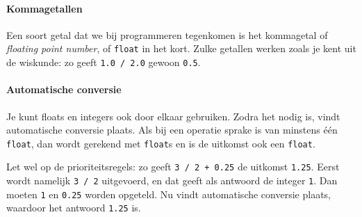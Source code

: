 \paragraph{Kommagetallen}

Een soort getal dat we bij programmeren tegenkomen is het kommagetal of \emph{floating point number}, of \texttt{float} in het kort. Zulke getallen werken zoals je kent uit de wiskunde: zo geeft \texttt{1.0\,/\,2.0} gewoon \texttt{0.5}.

\paragraph{Automatische conversie}

Je kunt floats en integers ook door elkaar gebruiken. Zodra het nodig is, vindt automatische conversie plaats. Als bij een operatie sprake is van minstens \'{e}\'{e}n \texttt{float}, dan wordt gerekend met \texttt{float}s en is de uitkomst ook een \texttt{float}.

Let wel op de prioriteitsregels: zo geeft \texttt{3\,/\,2\,+\,0.25} de uitkomst \texttt{1.25}. Eerst wordt namelijk \texttt{3\,/\,2} uitgevoerd, en dat geeft als antwoord de integer \texttt{1}. Dan moeten \texttt{1} en \texttt{0.25} worden opgeteld. Nu vindt automatische conversie plaats, waardoor het antwoord \texttt{1.25} is.
